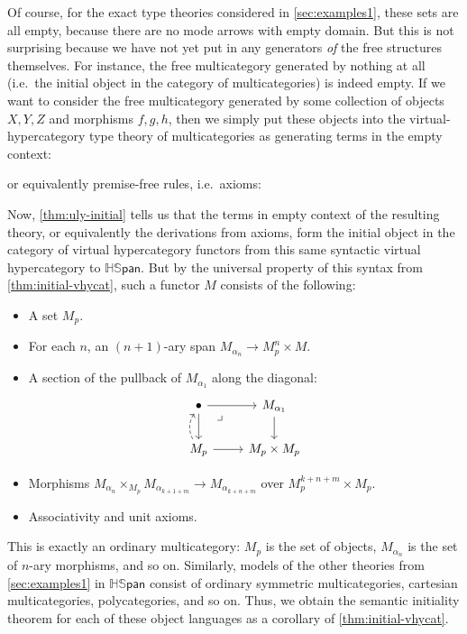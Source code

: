 \documentclass{article}
\theoremstyle{definition}
\theoremstyle{remark}
\def\hspan{\mathbb{HS}\mathsf{pan}}
\newcommand{\drpullback}[1][dr]{\ar[#1,phantom,near start,"\lrcorner"]}
\def\type{\;\mathsf{type}}
\let\types\vdash
\let\Types\Vdash
\begin{document}
Of course, for the exact type theories considered in \cref{sec:examples1}, these sets are all empty, because there are no mode arrows with empty domain.
But this is not surprising because we have not yet put in any generators \emph{of} the free structures themselves.
For instance, the free multicategory generated by nothing at all (i.e.\ the initial object in the category of multicategories) is indeed empty.
If we want to consider the free multicategory generated by some collection of objects $X,Y,Z$ and morphisms $f,g,h$, then we simply put these objects into the virtual-hypercategory type theory of multicategories as generating terms in the empty context:
or equivalently premise-free rules, i.e.\ axioms:
Now, \cref{thm:uly-initial} tells us that the terms in empty context of the resulting theory, or equivalently the derivations from axioms, form the initial object in the category of virtual hypercategory functors from this same syntactic virtual hypercategory to $\hspan$.
But by the universal property of this syntax from \cref{thm:initial-vhycat}, such a functor $M$ consists of the following:
\begin{itemize}
\item A set $M_p$.
\item For each $n$, an $(n+1)$-ary span $M_{\alpha_n} \to M_p^n \times M$.
\item A section of the pullback of $M_{\alpha_1}$ along the diagonal:
  \[
  \begin{tikzcd}
    \bullet \ar[d] \ar[r] \drpullback & M_{\alpha_1} \ar[d] \\
    M_p \ar[r] \ar[u,dashed,bend left] & M_p\times M_p
  \end{tikzcd}
  \]
\item Morphisms $M_{\alpha_n} \times_{M_p} M_{\alpha_{k+1+m}} \to M_{\alpha_{k+n+m}}$ over $M_p^{k+n+m} \times M_p$.
\item Associativity and unit axioms.
\end{itemize}
This is exactly an ordinary multicategory: $M_p$ is the set of objects, $M_{\alpha_n}$ is the set of $n$-ary morphisms, and so on.
Similarly, models of the other theories from \cref{sec:examples1} in $\hspan$ consist of ordinary symmetric multicategories, cartesian multicategories, polycategories, and so on.
Thus, we obtain the semantic initiality theorem for each of these object languages as a corollary of \cref{thm:initial-vhycat}.
\end{document}
